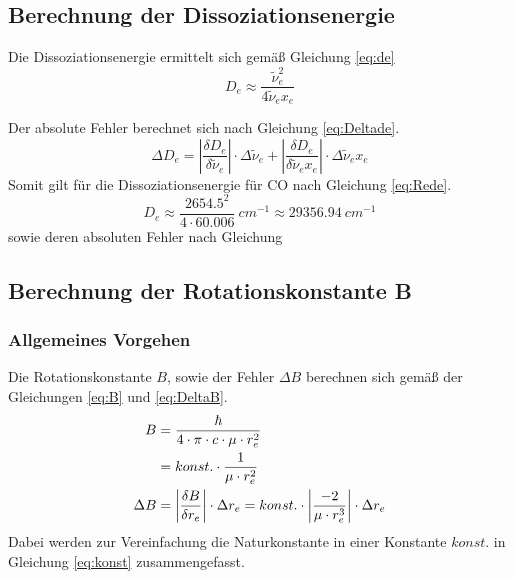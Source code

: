 \subsection{Berechnung der Dissoziationsenergie}
Die Dissoziationsenergie ermittelt sich gemäß Gleichung \ref{eq:de}
\begin{equation} 
	\label{eq:de}
		D_e \approx \frac{\tilde{\nu}_e^2}{4 \tilde{\nu}_e x_e}
\end{equation}

Der absolute Fehler berechnet sich nach Gleichung \ref{eq:Deltade}.
\begin{equation} 
	\label{eq:Deltade}
		\Delta D_e =\left|\frac{\delta D_e}{\delta \tilde{\nu}_e}\right|\cdot \Delta \tilde{\nu}_e + \left|\frac{\delta D_e}{\delta \tilde{\nu}_e x_e}\right|\cdot \Delta \tilde{\nu}_e x_e 
\end{equation}
Somit gilt für die Dissoziationsenergie für CO nach Gleichung \ref{eq:Rede}.
\begin{equation} 
	\label{eq:Rede}
		D_e \approx \frac{2654.5^2}{4\cdot60.006} ~\si
{cm^{-1}}  \approx  \SI[mode=math]{29356.94}{cm^{-1}} 
\end{equation}
sowie deren absoluten Fehler nach Gleichung 









\subsection{Berechnung der Rotationskonstante B}
\subsubsection*{Allgemeines Vorgehen}
Die Rotationskonstante $B$, sowie der Fehler $\Delta B$ berechnen sich gemäß der Gleichungen \ref{eq:B} und \ref{eq:DeltaB}.
\begin{align}
B 	
   			&= \frac{\hbar}{4 \cdot \pi \cdot c \cdot \mu  \cdot r_e^{2}}
   			\notag\\\label{eq:B}
   			&= konst.\cdot\frac{1}{\mu  \cdot r_e^{2}}
   			\\\label{eq:DeltaB}	
\Delta B	
   			&=  \left|\frac{\delta B}{\delta r_e}\right|\cdot\Delta r_e =konst. \cdot\left|\frac{-2}{\mu \cdot r_e^{3}  }\right|\cdot \Delta r_e  	
   			\end{align}
Dabei werden zur Vereinfachung die Naturkonstante in einer Konstante $konst.$ in Gleichung \ref{eq:konst} zusammengefasst.


